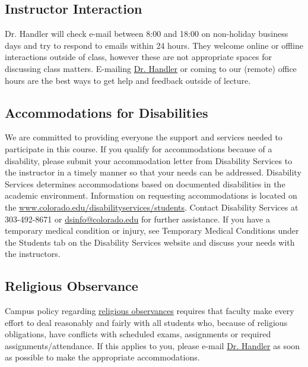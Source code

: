 \documentclass[10pt]{memoir}
\makeatletter
\def\instructorAemail{abe.handler@colorado.edu}
\makeatother
\begin{document}

\subsection{Instructor Interaction}
Dr. Handler will check e-mail between 8:00 and 18:00 on non-holiday business days and try to respond to emails within 24 hours. They welcome online or offline interactions outside of class, however these are not appropriate spaces for discussing class matters. E-mailing \href{\instructorAemail}{Dr. Handler} or coming to our (remote) office hours are the best ways to get help and feedback outside of lecture.

\subsection{Accommodations for Disabilities}
We are committed to providing everyone the support and services needed to participate in this course. If you qualify for accommodations because of a disability, please submit your accommodation letter from Disability Services to the instructor in a timely manner so that your needs can be addressed. Disability Services determines accommodations based on documented disabilities in the academic environment. Information on requesting accommodations is located on the \href{Disability Services website}{www.colorado.edu/disabilityservices/students}. Contact Disability Services at 303-492-8671 or \href{mailto:dsinfo@colorado.edu}{dsinfo@colorado.edu} for further assistance. If you have a temporary medical condition or injury, see Temporary Medical Conditions under the Students tab on the Disability Services website and discuss your needs with the instructors.

\subsection{Religious Observance}
Campus policy regarding \href{http://www.colorado.edu/policies/observance-religious-holidays-and-absences-classes-andor-exams}{religious observances} requires that faculty make every effort to deal reasonably and fairly with all students who, because of religious obligations, have conflicts with scheduled exams, assignments or required assignments/attendance. If this applies to you, please e-mail \href{\instructorAemail}{Dr. Handler} as soon as possible to make the appropriate accommodations.
\end{document}
